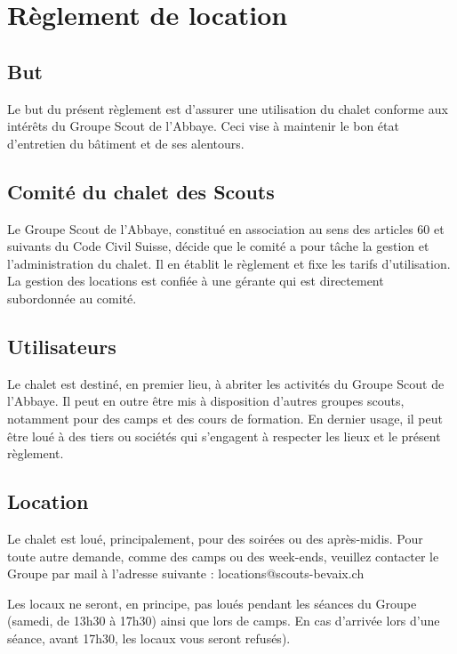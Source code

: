 \documentclass[a4paper,12pt]{extarticle}
\begin{document}
\newpage

\section{Règlement de location \label{sec:contract}}

\subsection{But}
Le but du présent règlement est d'assurer une utilisation du chalet conforme aux intérêts du Groupe Scout de l'Abbaye. Ceci vise à maintenir le bon état d'entretien du bâtiment et de ses alentours.

\subsection{Comité du chalet des Scouts}

Le Groupe Scout de l'Abbaye, constitué en association au sens des articles 60 et suivants du Code Civil Suisse, décide que le comité a pour tâche la gestion et l'administration du chalet. Il en établit le règlement et fixe les tarifs d'utilisation. 
La gestion des locations est confiée à une gérante qui est directement subordonnée au comité.

\subsection{Utilisateurs}
Le chalet est destiné, en premier lieu, à abriter les activités du Groupe Scout de l'Abbaye.
Il peut en outre être mis à disposition d'autres groupes scouts, notamment pour des camps et des cours de formation. En dernier usage, il peut être loué à des tiers ou sociétés qui s'engagent à respecter les lieux et le présent règlement.

\subsection{Location}

Le chalet est loué, principalement, pour des soirées ou des après-midis.
Pour toute autre demande, comme des camps ou des week-ends, veuillez contacter le Groupe par mail à l'adresse suivante : locations@scouts-bevaix.ch

{\color{red} Les locaux ne seront, en principe, pas loués pendant les séances du Groupe (samedi, de 13h30 à 17h30) ainsi que lors de camps. En cas d'arrivée lors d'une séance, avant 17h30, les locaux vous seront refusés). }
\end{document}
